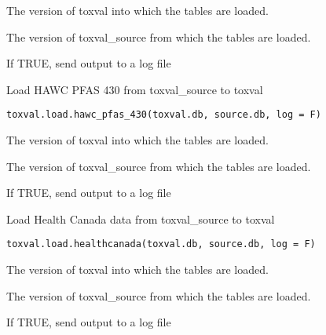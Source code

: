\documentclass[letterpaper]{book}
\begin{document}
%
\begin{Arguments}
\begin{ldescription}
\item[\code{toxval.db}] The version of toxval into which the tables are loaded.

\item[\code{source.db}] The version of toxval\_source from which the tables are loaded.

\item[\code{log}] If TRUE, send output to a log file
\end{ldescription}
\end{Arguments}
%
\begin{Description}\relax
Load HAWC PFAS 430 from toxval\_source to toxval
\end{Description}
%
\begin{Usage}
\begin{verbatim}
toxval.load.hawc_pfas_430(toxval.db, source.db, log = F)
\end{verbatim}
\end{Usage}
%
\begin{Arguments}
\begin{ldescription}
\item[\code{toxval.db}] The version of toxval into which the tables are loaded.

\item[\code{source.db}] The version of toxval\_source from which the tables are loaded.

\item[\code{log}] If TRUE, send output to a log file
\end{ldescription}
\end{Arguments}
%
\begin{Description}\relax
Load Health Canada data from toxval\_source to toxval
\end{Description}
%
\begin{Usage}
\begin{verbatim}
toxval.load.healthcanada(toxval.db, source.db, log = F)
\end{verbatim}
\end{Usage}
%
\begin{Arguments}
\begin{ldescription}
\item[\code{toxval.db}] The version of toxval into which the tables are loaded.

\item[\code{source.db}] The version of toxval\_source from which the tables are loaded.

\item[\code{log}] If TRUE, send output to a log file
\end{ldescription}
\end{Arguments}
\end{document}
